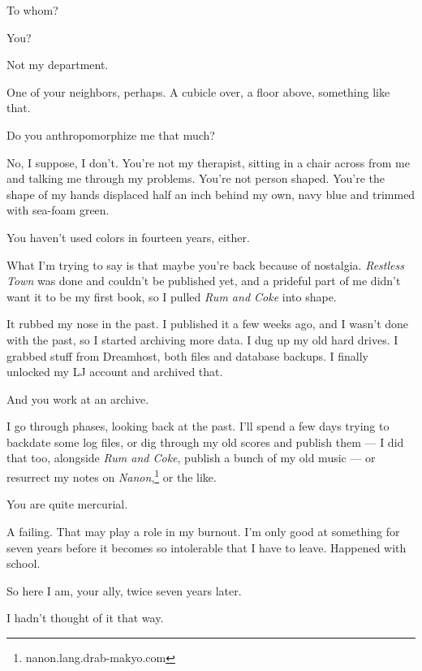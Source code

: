 \begin{paracol}{2}
\begin{leftcolumn}
\begin{ally}
To whom?
\end{ally}
You?

\begin{ally}
Not my department.
\end{ally}
One of your neighbors, perhaps. A cubicle over, a floor above, something like that.

\begin{ally}
Do you anthropomorphize me that much?
\end{ally}
No, I suppose, I don't. You're not my therapist, sitting in a chair across from me and talking me through my problems. You're not person shaped. You're the shape of my hands displaced half an inch behind my own, navy blue and trimmed with sea-foam green.

\begin{ally}
You haven't used colors in fourteen years, either.
\end{ally}
What I'm trying to say is that maybe you're back because of nostalgia. \emph{Restless Town} was done and couldn't be published yet, and a prideful part of me didn't want it to be my first book, so I pulled \emph{Rum and Coke} into shape.

It rubbed my nose in the past. I published it a few weeks ago, and I wasn't done with the past, so I started archiving more data. I dug up my old hard drives. I grabbed stuff from Dreamhost, both files and database backups. I finally unlocked my LJ account and archived that.

\begin{ally}
And you work at an archive.
\end{ally}
I go through phases, looking back at the past. I'll spend a few days trying to backdate some log files, or dig through my old scores and publish them --- I did that too, alongside \emph{Rum and Coke}, publish a bunch of my old music --- or resurrect my notes on \emph{Nanon},\footnote{nanon.lang.drab-makyo.com} or the like.

\begin{ally}
You are quite mercurial.
\end{ally}
A failing. That may play a role in my burnout. I'm only good at something for seven years before it becomes so intolerable that I have to leave. Happened with school.

\begin{ally}
So here I am, your ally, twice seven years later.
\end{ally}
I hadn't thought of it that way.


\end{leftcolumn}
\end{paracol}
